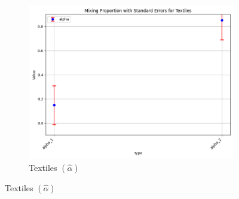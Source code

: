 \documentclass{article}
\begin{document}
\begin{figure}[ht!]
\begin{subfigure}[t]{0.32\textwidth}
    \end{subfigure}
    \begin{subfigure}[t]{0.32\textwidth}
        \centering
        \includegraphics[width=\textwidth]{figure/empirical_ar1_mixture_alpha_with_error_bars_Textiles.png}
        \caption{Textiles $(\hat\alpha)$}
    \end{subfigure}


\end{figure}
\end{document}
